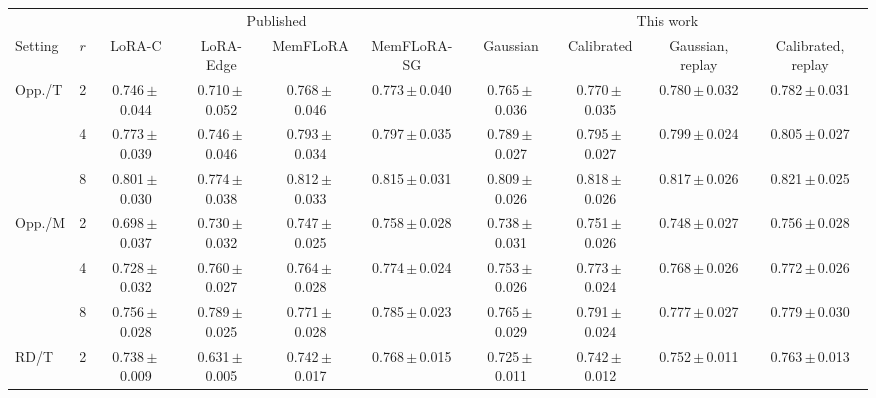 \begin{tabular}{@{}lc cccc cccc@{}}
\toprule
 & & \multicolumn{4}{c}{Published~\cite{akbulut2026memflora}} & \multicolumn{4}{c}{This work} \\
\cmidrule(lr){3-6}\cmidrule(l){7-10}
Setting & $r$ & LoRA-C & LoRA-Edge & MemFLoRA & MemFLoRA-SG & Gaussian & Calibrated & Gaussian, replay & Calibrated, replay \\
\midrule
Opp./T & 2 & 0.746\,{\scriptsize$\pm$\,0.044} & 0.710\,{\scriptsize$\pm$\,0.052} & 0.768\,{\scriptsize$\pm$\,0.046} & 0.773\,{\scriptsize$\pm$\,0.040} & 0.765\,{\scriptsize$\pm$\,0.036} & 0.770\,{\scriptsize$\pm$\,0.035} & 0.780\,{\scriptsize$\pm$\,0.032} & 0.782\,{\scriptsize$\pm$\,0.031} \\
 & 4 & 0.773\,{\scriptsize$\pm$\,0.039} & 0.746\,{\scriptsize$\pm$\,0.046} & 0.793\,{\scriptsize$\pm$\,0.034} & 0.797\,{\scriptsize$\pm$\,0.035} & 0.789\,{\scriptsize$\pm$\,0.027} & 0.795\,{\scriptsize$\pm$\,0.027} & 0.799\,{\scriptsize$\pm$\,0.024} & 0.805\,{\scriptsize$\pm$\,0.027} \\
 & 8 & 0.801\,{\scriptsize$\pm$\,0.030} & 0.774\,{\scriptsize$\pm$\,0.038} & 0.812\,{\scriptsize$\pm$\,0.033} & 0.815\,{\scriptsize$\pm$\,0.031} & 0.809\,{\scriptsize$\pm$\,0.026} & 0.818\,{\scriptsize$\pm$\,0.026} & 0.817\,{\scriptsize$\pm$\,0.026} & 0.821\,{\scriptsize$\pm$\,0.025} \\
\cmidrule(l){1-10}
Opp./M & 2 & 0.698\,{\scriptsize$\pm$\,0.037} & 0.730\,{\scriptsize$\pm$\,0.032} & 0.747\,{\scriptsize$\pm$\,0.025} & 0.758\,{\scriptsize$\pm$\,0.028} & 0.738\,{\scriptsize$\pm$\,0.031} & 0.751\,{\scriptsize$\pm$\,0.026} & 0.748\,{\scriptsize$\pm$\,0.027} & 0.756\,{\scriptsize$\pm$\,0.028} \\
 & 4 & 0.728\,{\scriptsize$\pm$\,0.032} & 0.760\,{\scriptsize$\pm$\,0.027} & 0.764\,{\scriptsize$\pm$\,0.028} & 0.774\,{\scriptsize$\pm$\,0.024} & 0.753\,{\scriptsize$\pm$\,0.026} & 0.773\,{\scriptsize$\pm$\,0.024} & 0.768\,{\scriptsize$\pm$\,0.026} & 0.772\,{\scriptsize$\pm$\,0.026} \\
 & 8 & 0.756\,{\scriptsize$\pm$\,0.028} & 0.789\,{\scriptsize$\pm$\,0.025} & 0.771\,{\scriptsize$\pm$\,0.028} & 0.785\,{\scriptsize$\pm$\,0.023} & 0.765\,{\scriptsize$\pm$\,0.029} & 0.791\,{\scriptsize$\pm$\,0.024} & 0.777\,{\scriptsize$\pm$\,0.027} & 0.779\,{\scriptsize$\pm$\,0.030} \\
\midrule
RD/T & 2 & 0.738\,{\scriptsize$\pm$\,0.009} & 0.631\,{\scriptsize$\pm$\,0.005} & 0.742\,{\scriptsize$\pm$\,0.017} & 0.768\,{\scriptsize$\pm$\,0.015} & 0.725\,{\scriptsize$\pm$\,0.011} & 0.742\,{\scriptsize$\pm$\,0.012} & 0.752\,{\scriptsize$\pm$\,0.011} & 0.763\,{\scriptsize$\pm$\,0.013} \\

\end{tabular}
